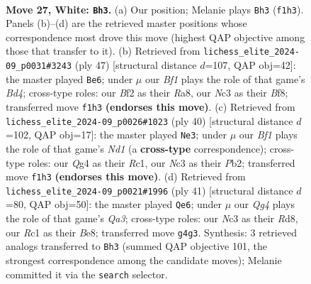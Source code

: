 \documentclass[11pt]{article}
\begin{document}
\begin{figure}[p]
\label{fig:thought-m50}
\end{figure}

\clearpage

\begin{figure}[p]\centering
\begin{subfigure}{0.46\textwidth}\centering
\resizebox{\linewidth}{!}{%
\newchessgame
\chessboard[
  setfen={r1b4r/1q3kbp/p1npp1p1/1p2p1P1/4PnQP/2N2P2/PPPK1B2/R1R2B2 w - - 5 27},
  showmover=false,
  pgfstyle=straightmove, color=movearrow, markmove={f1-h3}
]}
\caption{}
\end{subfigure}\hfill
\begin{subfigure}{0.46\textwidth}\centering
\resizebox{\linewidth}{!}{%
\newchessgame
\chessboard[
  setfen={r3rbk1/1pp2p2/2n2q1p/3bpNpP/p5P1/P1BPP3/1PQRBP2/4K1R1 b - - 4 24},
  showmover=false,
  pgfstyle=straightmove, color=movearrow, markmove={d5-e6}
]}
\caption{}
\end{subfigure}
\\[4pt]
\begin{subfigure}{0.46\textwidth}\centering
\resizebox{\linewidth}{!}{%
\newchessgame
\chessboard[
  setfen={r1q2r1k/1b4pp/2p1pb2/p2n1p2/Pp1P4/3Q1BP1/1P1BPP1P/R1RN2K1 w - - 2 21},
  showmover=false,
  pgfstyle=straightmove, color=movearrow, markmove={d1-e3}
]}
\caption{}
\end{subfigure}\hfill
\begin{subfigure}{0.46\textwidth}\centering
\resizebox{\linewidth}{!}{%
\newchessgame
\chessboard[
  setfen={1k1rbb1r/ppp5/q4p2/3np1pp/2N5/PP1PP2P/1BQ2PP1/R2R1BK1 b - - 1 21},
  showmover=false,
  pgfstyle=straightmove, color=movearrow, markmove={a6-e6}
]}
\caption{}
\end{subfigure}
\caption{\textbf{Move 27, White: \texttt{Bh3}.} (a) Our position; Melanie plays \texttt{Bh3} (\texttt{f1h3}). Panels (b)--(d) are the retrieved master positions whose correspondence most drove this move (highest QAP objective among those that transfer to it). (b) Retrieved from \texttt{lichess\_elite\_2024-09\_p0031\#3243} (ply 47) [structural distance $d$=107, QAP obj=42]: the master played \texttt{Be6}; under $\mu$ our \emph{Bf1} plays the role of that game's \emph{Bd4}; cross-type roles: our \emph{B}f2 as their \emph{R}a8, our \emph{N}c3 as their \emph{B}f8; transferred move \texttt{f1h3} \textbf{(endorses this move)}. (c) Retrieved from \texttt{lichess\_elite\_2024-09\_p0026\#1023} (ply 40) [structural distance $d$=102, QAP obj=17]: the master played \texttt{Ne3}; under $\mu$ our \emph{Bf1} plays the role of that game's \emph{Nd1} (a \textbf{cross-type} correspondence); cross-type roles: our \emph{Q}g4 as their \emph{R}c1, our \emph{N}c3 as their \emph{P}b2; transferred move \texttt{f1h3} \textbf{(endorses this move)}. (d) Retrieved from \texttt{lichess\_elite\_2024-09\_p0021\#1996} (ply 41) [structural distance $d$=80, QAP obj=50]: the master played \texttt{Qe6}; under $\mu$ our \emph{Qg4} plays the role of that game's \emph{Qa3}; cross-type roles: our \emph{N}c3 as their \emph{R}d8, our \emph{R}c1 as their \emph{B}e8; transferred move \texttt{g4g3}. Synthesis: 3 retrieved analogs transferred to \texttt{Bh3} (summed QAP objective 101, the strongest correspondence among the candidate moves); Melanie committed it via the \texttt{search} selector.}

\end{figure}
\end{document}
